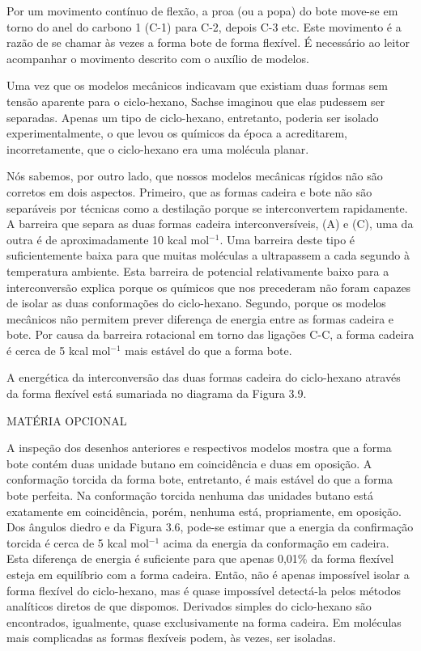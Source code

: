 \noindent Por um movimento contínuo de flexão, a proa (ou a popa) do bote move-se em torno do anel do carbono 1 (C-1) para C-2, depois C-3 etc. Este movimento é a razão de se chamar às vezes a forma bote de forma flexível. É necessário ao leitor acompanhar o movimento descrito com o auxílio de modelos. 

Uma vez que os modelos mecânicos indicavam que existiam duas formas sem tensão aparente para o ciclo-hexano, Sachse imaginou que elas pudessem ser separadas. Apenas um tipo de ciclo-hexano, entretanto, poderia ser isolado experimentalmente, o que levou os químicos da época a acreditarem, incorretamente, que o ciclo-hexano era uma molécula planar.

Nós sabemos, por outro lado, que nossos modelos mecânicas rígidos não são corretos em dois aspectos. Primeiro, que as formas cadeira e bote não são separáveis por técnicas como a destilação porque se interconvertem rapidamente. A barreira que separa as duas formas cadeira interconversíveis, (A) e (C), uma da outra é de aproximadamente 10 kcal mol$^{-1}$. Uma barreira deste tipo é suficientemente baixa para que muitas moléculas a ultrapassem a cada segundo à temperatura ambiente. Esta barreira de potencial relativamente baixo para a interconversão explica porque os químicos que nos precederam não foram capazes de isolar as duas conformações do ciclo-hexano. Segundo, porque os modelos mecânicos não permitem prever diferença de energia entre as formas cadeira e bote. Por causa da barreira rotacional em torno das ligações C-C, a forma cadeira é cerca de 5 kcal mol$^{-1}$ mais estável do que a forma bote.

A energética da interconversão das duas formas cadeira do ciclo-hexano através da forma flexível está sumariada no diagrama da Figura 3.9.

\noindent MATÉRIA OPCIONAL

\begin{small}
\noindent A inspeção dos desenhos anteriores e respectivos modelos mostra que a forma bote contém duas unidade butano em coincidência e duas em oposição. A conformação torcida da forma bote, entretanto, é mais estável do que a forma bote perfeita. Na conformação torcida nenhuma das unidades butano está exatamente em coincidência, porém, nenhuma está, propriamente, em oposição. Dos ângulos diedro e da Figura 3.6, pode-se estimar que a energia da confirmação torcida é cerca de 5 kcal mol$^{-1}$ acima da energia da conformação em cadeira. Esta diferença de energia é suficiente para que apenas 0,01\% da forma flexível esteja em equilíbrio com a forma cadeira. Então, não é apenas impossível isolar a forma flexível do ciclo-hexano, mas é quase impossível detectá-la pelos métodos analíticos diretos de que dispomos. Derivados simples do ciclo-hexano são encontrados, igualmente, quase exclusivamente na forma cadeira. Em moléculas mais complicadas as formas flexíveis podem, às vezes, ser isoladas.
\end{small}


